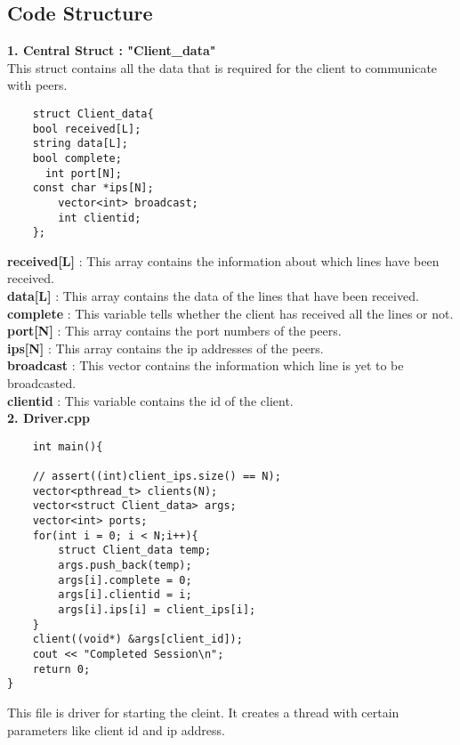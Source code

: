 \documentclass[12pt]{scrartcl}
\begin{document}
\subsection{Code Structure}
\textbf{1. Central Struct : "Client\_data"}\\
This struct contains all the data that is required for the client to communicate with peers.\\
\begin{verbatim}
    struct Client_data{
    bool received[L];
    string data[L];
    bool complete;
 	  int port[N];
    const char *ips[N];
	    vector<int> broadcast;
	    int clientid;
    };
\end{verbatim}
\textbf{received[L]} : This array contains the information about which lines have been received.\\
\textbf{data[L]} : This array contains the data of the lines that have been received.\\
\textbf{complete} : This variable tells whether the client has received all the lines or not.\\
\textbf{port[N]} : This array contains the port numbers of the peers.\\
\textbf{ips[N]} : This array contains the ip addresses of the peers.\\
\textbf{broadcast} : This vector contains the information which line is yet to be broadcasted.\\
\textbf{clientid} : This variable contains the id of the client.\\

\textbf{2. Driver.cpp}\\
\begin{verbatim}
    int main(){

    // assert((int)client_ips.size() == N);
    vector<pthread_t> clients(N);
    vector<struct Client_data> args;
    vector<int> ports;
    for(int i = 0; i < N;i++){
        struct Client_data temp;
        args.push_back(temp);
        args[i].complete = 0;
        args[i].clientid = i;
        args[i].ips[i] = client_ips[i];
    }
    client((void*) &args[client_id]);
    cout << "Completed Session\n";
    return 0;
}
\end{verbatim}
This file is driver for starting the cleint. It creates a thread with certain parameters like client id and ip address.\\
\end{document}
